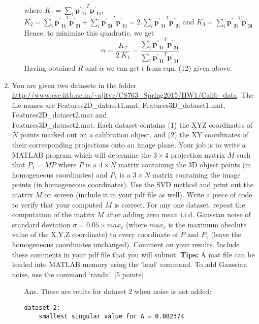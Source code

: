 \documentclass[11pt]{article}
\begin{document}
\begin{enumerate}
\begin{itemize}
where $K_1=\sum_i \mathbf{{p^{'}}_{1i}}^T\mathbf{{p^{'}}_{1i}}$, $K_2=\sum_i \mathbf{{p^{'}}_{1i}}^T\mathbf{{p^{'}}_{2i}}+\sum_i \mathbf{{p^{'}}_{2i}}^T\mathbf{{p^{'}}_{1i}}=2.\sum_i \mathbf{{p^{'}}_{1i}}^T\mathbf{{p^{'}}_{2i}}$ and $K_3=\sum_i \mathbf{{p^{'}}_{2i}}^T\mathbf{{p^{'}}_{2i}}$\newline
Hence, to minimize this quadratic, we get \begin{equation}
\alpha= \frac{K_2}{2.K_1}=\frac{\sum_i \mathbf{{p^{'}}_{1i}}^T\mathbf{{p^{'}}_{2i}}}{\sum_i \mathbf{{p^{'}}_{1i}}^T\mathbf{{p^{'}}_{1i}}}
\end{equation}
Having obtained $R$ and $\alpha$ we can get $t$ from eqn. (12) given above.
\end{itemize}
\item You are given two datasets in the folder \url{http://www.cse.iitb.ac.in/~ajitvr/CS763_Spring2015/HW1/Calib_data}. The file names are Features2D\_dataset1.mat, Features3D\_dataset1.mat, Features2D\_dataset2.mat and \\ Features3D\_dataset2.mat. Each dataset contains (1) the XYZ coordinates of $N$ points marked out on a calibration object, and (2) the XY coordinates of their corresponding projections onto an image plane. Your job is to write a MATLAB program which will determine the $3 \times 4$ projection matrix $M$ such that $P_1 = MP$ where $P$ is a $4 \times N$ matrix containing the 3D object points (in homogeneous coordinates) and $P_1$ is a $3 \times N$ matrix containing the image points (in homogeneous coordinates). Use the SVD method and print out the matrix $M$ on screen (include it in your pdf file as well). Write a piece of code to verify that your computed $M$ is correct. For any one dataset, repeat the computation of the matrix $M$ after adding zero mean i.i.d. Gaussian noise of standard deviation $\sigma = 0.05 \times max_c$ (where $max_c$ is the maximum absolute value of the X,Y,Z coordinate) to every coordinate of $P$ and $P_1$ (leave the homogeneous coordinates unchanged). Comment on your results. Include these comments in your pdf file that you will submit. \textbf{Tips:} A mat file can be loaded into MATLAB memory using the `load' command. To add Gaussian noise, use the command `randn'. \textsf{[5 points]}
\begin{itemize}
	\item[Ans.] 
	These are reults for dataset 2 when noise is not added:
	\begin{Verbatim}[frame=single]
	dataset 2: 
	smallest singular value for A = 0.082374


\end{Verbatim}
\end{itemize}
\end{enumerate}
\end{document}
